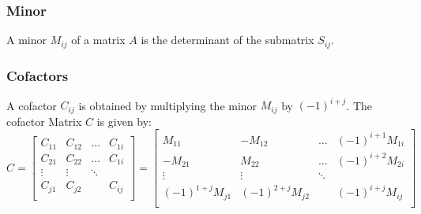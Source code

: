 \documentclass{book}
\begin{document}
\subsubsection{Minor}
A minor \(M_{ij}\) of a matrix \(A\) is the determinant of the submatrix \(S_{ij}\).
\subsubsection{Cofactors}
A cofactor \( C_{ij} \) is obtained by multiplying the minor \( M_{ij} \) by \( (-1)^{i + j} \). The cofactor Matrix \(C \) is given by:
\begin{equation}
    C = \begin{bmatrix}
        C_{11} & C_{12} & \dots  & C_{1i} \\
        C_{21} & C_{22} & \dots  & C_{1i} \\
        \vdots & \vdots & \ddots          \\
        C_{j1} & C_{j2} &        & C_{ij} \\
    \end{bmatrix} =  \begin{bmatrix}
        M_{11}            & -M_{12}             & \dots  & (-1)^{i + 1}M_{1i}  \\
        -M_{21}           & M_{22}              & \dots  & (-1)^{i + 2} M_{2i} \\
        \vdots            & \vdots              & \ddots                       \\
        (-1)^{1+ j}M_{j1} & (-1)^{2 + j} M_{j2} &        & (-1)^{i + j} M_{ij} \\
    \end{bmatrix}
\end{equation}
\end{document}
